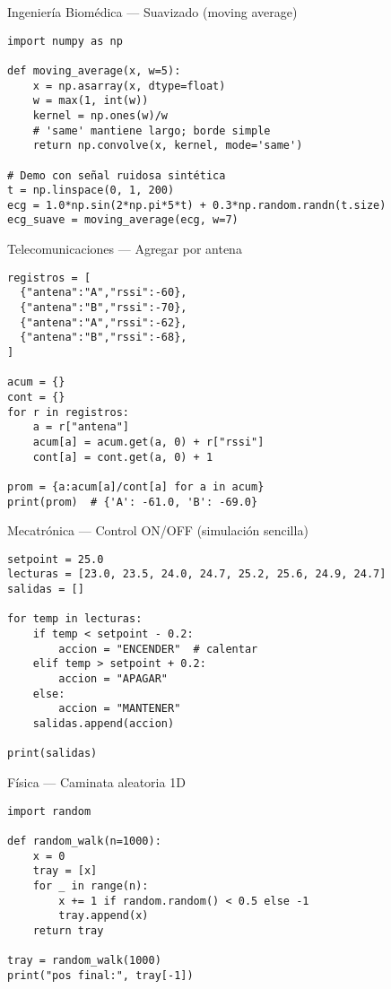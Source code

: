 \documentclass[aspectratio=169,professionalfonts]{beamer}
\begin{document}
\begin{frame}[fragile]{Ingeniería Biomédica — Suavizado (moving average)}
\begin{verbatim}
import numpy as np

def moving_average(x, w=5):
    x = np.asarray(x, dtype=float)
    w = max(1, int(w))
    kernel = np.ones(w)/w
    # 'same' mantiene largo; borde simple
    return np.convolve(x, kernel, mode='same')

# Demo con señal ruidosa sintética
t = np.linspace(0, 1, 200)
ecg = 1.0*np.sin(2*np.pi*5*t) + 0.3*np.random.randn(t.size)
ecg_suave = moving_average(ecg, w=7)
\end{verbatim}
\end{frame}

\begin{frame}[fragile]{Telecomunicaciones — Agregar por antena}
\begin{verbatim}
registros = [
  {"antena":"A","rssi":-60},
  {"antena":"B","rssi":-70},
  {"antena":"A","rssi":-62},
  {"antena":"B","rssi":-68},
]

acum = {}
cont = {}
for r in registros:
    a = r["antena"]
    acum[a] = acum.get(a, 0) + r["rssi"]
    cont[a] = cont.get(a, 0) + 1

prom = {a:acum[a]/cont[a] for a in acum}
print(prom)  # {'A': -61.0, 'B': -69.0}
\end{verbatim}
\end{frame}

\begin{frame}[fragile]{Mecatrónica — Control ON/OFF (simulación sencilla)}
\begin{verbatim}
setpoint = 25.0
lecturas = [23.0, 23.5, 24.0, 24.7, 25.2, 25.6, 24.9, 24.7]
salidas = []

for temp in lecturas:
    if temp < setpoint - 0.2:
        accion = "ENCENDER"  # calentar
    elif temp > setpoint + 0.2:
        accion = "APAGAR"
    else:
        accion = "MANTENER"
    salidas.append(accion)

print(salidas)
\end{verbatim}
\end{frame}

\begin{frame}[fragile]{Física — Caminata aleatoria 1D}
\begin{verbatim}
import random

def random_walk(n=1000):
    x = 0
    tray = [x]
    for _ in range(n):
        x += 1 if random.random() < 0.5 else -1
        tray.append(x)
    return tray

tray = random_walk(1000)
print("pos final:", tray[-1])
\end{verbatim}
\end{frame}
\end{document}
